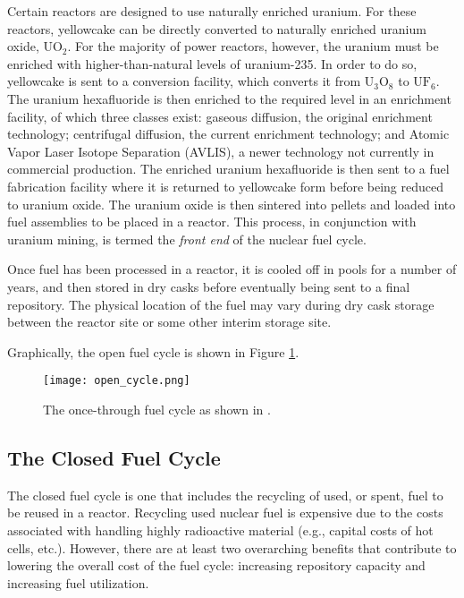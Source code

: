 Certain reactors are designed to use naturally enriched uranium. For these
reactors, yellowcake can be directly converted to naturally enriched uranium
oxide, $\mathrm{UO_2}$. For the majority of power reactors, however, the uranium
must be enriched with higher-than-natural levels of uranium-235. In order to do
so, yellowcake is sent to a conversion facility, which converts it from
$\mathrm{U_3O_8}$ to $\mathrm{UF_6}$. The uranium hexafluoride is then enriched
to the required level in an enrichment facility, of which three classes exist:
gaseous diffusion, the original enrichment technology; centrifugal diffusion,
the current enrichment technology; and Atomic Vapor Laser Isotope Separation
(AVLIS), a newer technology not currently in commercial production. The enriched
uranium hexafluoride is then sent to a fuel fabrication facility where it is
returned to yellowcake form before being reduced to uranium oxide. The uranium
oxide is then sintered into pellets and loaded into fuel assemblies to be placed
in a reactor. This process, in conjunction with uranium mining, is termed the
\textit{front end} of the nuclear fuel cycle.

Once fuel has been processed in a reactor, it is cooled off in pools for a
number of years, and then stored in dry casks before eventually being sent to a
final repository. The physical location of the fuel may vary during dry cask
storage between the reactor site or some other interim storage site.

Graphically, the open fuel cycle is shown in Figure \ref{fig:open-cycle}.

\begin{figure}[]
  \begin{center}
    \texttt{[image: open\_cycle.png]}
  \caption{The once-through fuel cycle as shown in \cite{cochran1990nuclear}.}
  \label{fig:open-cycle}
  \end{center}
\end{figure}

\subsection{The Closed Fuel Cycle}

The closed fuel cycle is one that includes the recycling of used, or spent, fuel
to be reused in a reactor. Recycling used nuclear fuel is expensive due to the
costs associated with handling highly radioactive material (e.g., capital costs
of hot cells, etc.). However, there are at least two overarching benefits that
contribute to lowering the overall cost of the fuel cycle: increasing repository
capacity and increasing fuel utilization.

